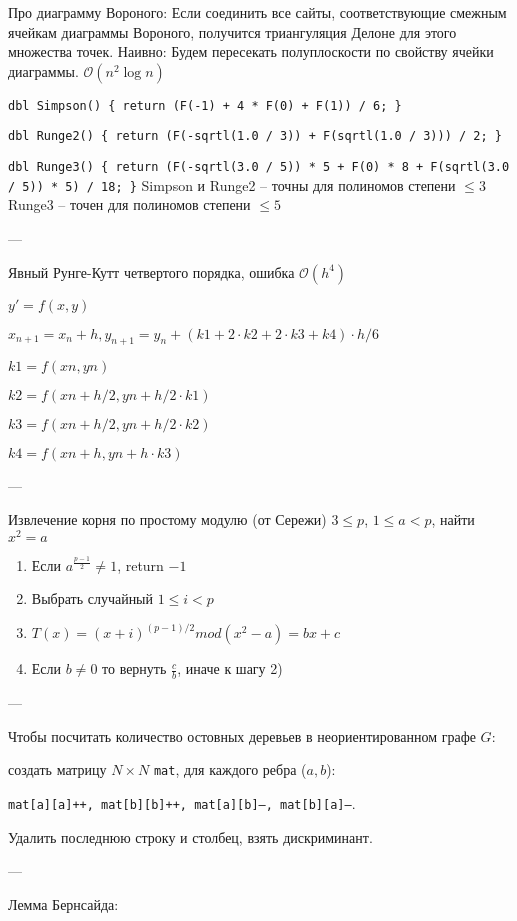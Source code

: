 Про диаграмму Вороного: Если соединить все сайты, соответствующие смежным ячейкам диаграммы Вороного, получится триангуляция Делоне для этого множества точек.
Наивно: Будем пересекать полуплоскости по свойству ячейки диаграммы. $\mathcal{O}(n^2 \log n)$

\texttt{dbl Simpson() \{ return (F(-1) + 4 * F(0) + F(1)) / 6; \}}

\texttt{dbl Runge2() \{ return (F(-sqrtl(1.0 / 3)) + F(sqrtl(1.0 / 3))) / 2; \}}

\texttt{dbl Runge3() \{ return (F(-sqrtl(3.0 / 5)) * 5 + F(0) * 8 + F(sqrtl(3.0 / 5)) * 5) / 18; \}}
Simpson и Runge2 -- точны для полиномов степени $\le 3$
Runge3 -- точен для полиномов степени $\le 5$

---

Явный Рунге-Кутт четвертого порядка, ошибка $\mathcal{O}(h^4)$

$y' = f(x, y)$

$x_{n + 1} = x_n + h, y_{n+1} = y_n + (k1 + 2 \cdot k2 + 2 \cdot k3 + k4) \cdot h / 6$

$k1 = f(xn, yn)$

$k2 = f(xn + h/2, yn + h/2 \cdot k1)$

$k3 = f(xn + h/2, yn + h/2 \cdot k2)$

$k4 = f(xn + h, yn + h \cdot k3)$

---

Извлечение корня по простому модулю (от Сережи)
$3 \leq p$, $1 \leq a < p$, найти $x^2 = a$
\begin{enumerate}
\item Если $a^{\frac{p - 1}{2}} \ne 1$, return $-1$
\item Выбрать случайный $1 \leq i < p$
\item $T(x) = (x + i)^{(p - 1)/2} mod (x^2 - a) = bx + c$
\item Если $b \ne 0$ то вернуть $\frac{c}{b}$, иначе к шагу 2)
\end{enumerate}

---

Чтобы посчитать количество остовных деревьев в неориентированном графе $G$:

    создать матрицу $N \times N$ \texttt{mat}, для каждого ребра ($a, b$):
    
	\texttt{mat[a][a]++, mat[b][b]++, mat[a][b]--, mat[b][a]--}.
	
	Удалить последнюю строку и столбец, взять дискриминант.
	
---

Лемма Бернсайда:

